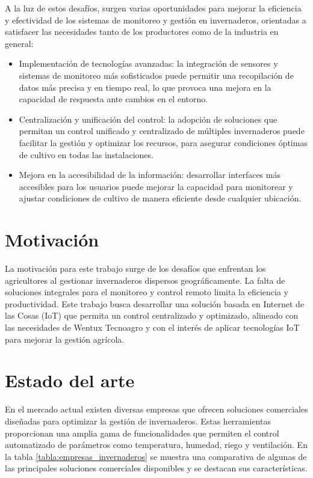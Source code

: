 A la luz de estos desafíos, surgen varias oportunidades para mejorar la eficiencia y efectividad de los sistemas de monitoreo y gestión en invernaderos, orientadas a satisfacer las necesidades tanto de los productores como de la industria en general:

\begin{itemize}
	\item Implementación de tecnologías avanzadas: la integración de sensores y sistemas de monitoreo más sofisticados puede permitir una recopilación de datos más precisa y en tiempo real, lo que provoca una mejora en la capacidad de respuesta ante cambios en el entorno.
	\item Centralización y unificación del control: la adopción de soluciones que permitan un control unificado y centralizado de múltiples invernaderos puede facilitar la gestión y optimizar los recursos, para asegurar condiciones óptimas de cultivo en todas las instalaciones.
	\item Mejora en la accesibilidad de la información: desarrollar interfaces más accesibles para los usuarios puede mejorar la capacidad para monitorear y ajustar condiciones de cultivo de manera eficiente desde cualquier ubicación.
\end{itemize}


\section{Motivación}

La motivación para este trabajo surge de los desafíos que enfrentan los agricultores al gestionar invernaderos dispersos geográficamente. La falta de soluciones integrales para el monitoreo y control remoto limita la eficiencia y productividad. Este trabajo busca desarrollar una solución basada en Internet de las Cosas (IoT) que permita un control centralizado y optimizado, alineado con las necesidades de Wentux Tecnoagro \citep{wentux} y con el interés de aplicar tecnologías IoT para mejorar la gestión agrícola.


\section{Estado del arte}
En el mercado actual existen diversas empresas que ofrecen soluciones comerciales diseñadas para optimizar la gestión de invernaderos. Estas herramientas proporcionan una amplia gama de funcionalidades que permiten el control automatizado de parámetros como temperatura, humedad, riego y ventilación. En la tabla \ref{tabla:empresas_invernaderos} se muestra una comparativa de algunas de las principales soluciones comerciales disponibles y se destacan sus características.

